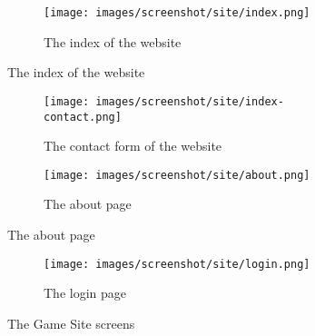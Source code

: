 \begin{figure}[H]
        \begin{subfigure}[b]{\textwidth}
                \centering
\texttt{[image: images/screenshot/site/index.png]}
\caption{The index of the website}
\label{fig:siteIndex}
        \end{subfigure}%
\end{figure}
\begin{figure}[H]   
        \begin{subfigure}[b]{\textwidth}
                \centering
\texttt{[image: images/screenshot/site/index-contact.png]}
\caption{The contact form of the website}
\label{fig:siteContactForm}
        \end{subfigure}     
        
        \begin{subfigure}[b]{\textwidth}
                \centering
\texttt{[image: images/screenshot/site/about.png]}
\caption{The about page}
\label{fig:siteAbout}
        \end{subfigure} 
\end{figure}
\begin{figure}[H]   
        \begin{subfigure}[b]{\textwidth}
                \centering
\texttt{[image: images/screenshot/site/login.png]}
\caption{The login page}
\label{fig:siteLogin}
        \end{subfigure}
        \caption{The Game Site screens}
        \label{fig:gameSite}
\end{figure}

